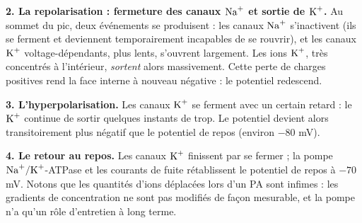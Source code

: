 \documentclass[11pt]{article}
\begin{document}
\textbf{2. La repolarisation : fermeture des canaux $\ce{Na+}$ et sortie de $\ce{K+}$.} Au sommet du pic, deux événements se produisent : les canaux $\ce{Na+}$ s'inactivent (ils se ferment et deviennent temporairement incapables de se rouvrir), et les canaux $\ce{K+}$ voltage-dépendants, plus lents, s'ouvrent largement. Les ions $\ce{K+}$, très concentrés à l'intérieur, \emph{sortent} alors massivement. Cette perte de charges positives rend la face interne à nouveau négative : le potentiel redescend.

\textbf{3. L'hyperpolarisation.} Les canaux $\ce{K+}$ se ferment avec un certain retard : le $\ce{K+}$ continue de sortir quelques instants de trop. Le potentiel devient alors transitoirement plus négatif que le potentiel de repos (environ $-80$ mV).

\textbf{4. Le retour au repos.} Les canaux $\ce{K+}$ finissent par se fermer ; la pompe $\ce{Na+}/\ce{K+}$-ATPase et les courants de fuite rétablissent le potentiel de repos à $-70$ mV. Notons que les quantités d'ions déplacées lors d'un PA sont infimes : les gradients de concentration ne sont pas modifiés de façon mesurable, et la pompe n'a qu'un rôle d'entretien à long terme.
\end{document}
